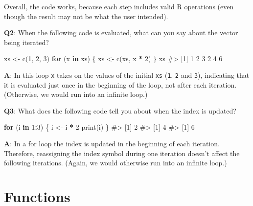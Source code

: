 \documentclass[
]{krantz}
\makeatletter
\newenvironment{Shaded}{\begin{snugshade}}{\end{snugshade}}
\newcommand{\CommentTok}[1]{\textcolor[rgb]{0.56,0.35,0.01}{\textit{#1}}}
\newcommand{\ControlFlowTok}[1]{\textcolor[rgb]{0.13,0.29,0.53}{\textbf{#1}}}
\newcommand{\DecValTok}[1]{\textcolor[rgb]{0.00,0.00,0.81}{#1}}
\newcommand{\KeywordTok}[1]{\textcolor[rgb]{0.13,0.29,0.53}{\textbf{#1}}}
\newcommand{\NormalTok}[1]{#1}
\newcommand{\OperatorTok}[1]{\textcolor[rgb]{0.81,0.36,0.00}{\textbf{#1}}}
\newcommand{\StringTok}[1]{\textcolor[rgb]{0.31,0.60,0.02}{#1}}
\newenvironment{kframe}{%
\medskip{}
\setlength{\fboxsep}{.8em}
 \def\at@end@of@kframe{}%
 \ifinner\ifhmode%
  \def\at@end@of@kframe{\end{minipage}}%
  \begin{minipage}{\columnwidth}%
 \fi\fi%
 \def\FrameCommand##1{\hskip\@totalleftmargin \hskip-\fboxsep
 \colorbox{shadecolor}{##1}\hskip-\fboxsep
     \hskip-\linewidth \hskip-\@totalleftmargin \hskip\columnwidth}%
 \MakeFramed {\advance\hsize-\width
   \@totalleftmargin\z@ \linewidth\hsize
   \@setminipage}}%
 {\par\unskip\endMakeFramed%
 \at@end@of@kframe}
\renewenvironment{Shaded}{\begin{kframe}}{\end{kframe}}
\renewcommand{\KeywordTok} [1]{\textcolor[rgb]{0.00,0.44,0.13}{{#1}}}
\renewcommand{\DecValTok}  [1]{\textcolor[rgb]{0.25,0.63,0.44}{{#1}}}
\renewcommand{\StringTok}  [1]{\textcolor[rgb]{0.25,0.44,0.63}{{#1}}}
\renewcommand{\CommentTok} [1]{\textcolor[rgb]{0.38,0.63,0.69}{{#1}}}
\renewcommand{\NormalTok}  [1]{{#1}}
\makeatother
\begin{document}
Overall, the code works, because each step includes valid R operations (even though the result may not be what the user intended).

\textbf{{Q2}}: When the following code is evaluated, what can you say about the vector being iterated?

\begin{Shaded}
\begin{Highlighting}[]
\NormalTok{xs <-}\StringTok{ }\KeywordTok{c}\NormalTok{(}\DecValTok{1}\NormalTok{, }\DecValTok{2}\NormalTok{, }\DecValTok{3}\NormalTok{)}
\ControlFlowTok{for}\NormalTok{ (x }\ControlFlowTok{in}\NormalTok{ xs) \{}
\NormalTok{  xs <-}\StringTok{ }\KeywordTok{c}\NormalTok{(xs, x }\OperatorTok{*}\StringTok{ }\DecValTok{2}\NormalTok{)}
\NormalTok{\}}
\NormalTok{xs}
\CommentTok{#> [1] 1 2 3 2 4 6}
\end{Highlighting}
\end{Shaded}

\textbf{{A}}: In this loop \texttt{x} takes on the values of the initial \texttt{xs} (\texttt{1}, \texttt{2} and \texttt{3}), indicating that it is evaluated just once in the beginning of the loop, not after each iteration. (Otherwise, we would run into an infinite loop.)

\textbf{{Q3}}: What does the following code tell you about when the index is updated?

\begin{Shaded}
\begin{Highlighting}[]
\ControlFlowTok{for}\NormalTok{ (i }\ControlFlowTok{in} \DecValTok{1}\OperatorTok{:}\DecValTok{3}\NormalTok{) \{}
\NormalTok{  i <-}\StringTok{ }\NormalTok{i }\OperatorTok{*}\StringTok{ }\DecValTok{2}
  \KeywordTok{print}\NormalTok{(i) }
\NormalTok{\}}
\CommentTok{#> [1] 2}
\CommentTok{#> [1] 4}
\CommentTok{#> [1] 6}
\end{Highlighting}
\end{Shaded}

\textbf{{A}}: In a for loop the index is updated in the beginning of each iteration. Therefore, reassigning the index symbol during one iteration doesn't affect the following iterations. (Again, we would otherwise run into an infinite loop.)

\hypertarget{functions}{%
\chapter{Functions}\label{functions}}

\end{document}
